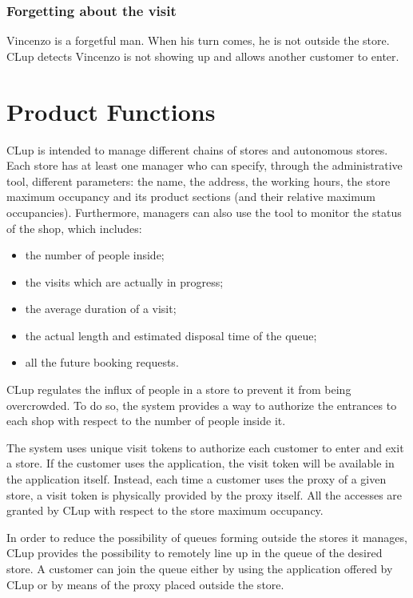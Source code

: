 \documentclass[a4paper,oneside,11pt]{book}   %
\begin{document}
        \subsubsection{Forgetting about the visit}
        Vincenzo is a forgetful man. When his turn comes, he is not outside the store. CLup detects Vincenzo is not showing up and allows another customer to enter.
    
    \section{Product Functions}
    CLup is intended to manage different chains of stores and autonomous stores. Each store has at least one manager who can specify, through the administrative tool, different parameters: the name, the address, the working hours, the store maximum occupancy and its product sections (and their relative maximum occupancies). Furthermore, managers can also use the tool to monitor the status of the shop, which includes:
    \begin{itemize}
        \item the number of people inside;
        \item the visits which are actually in progress;
        \item the average duration of a visit;
        \item the actual length and estimated disposal time of the queue;
        \item all the future booking requests.
    \end{itemize}
    CLup regulates the influx of people in a store to prevent it from being overcrowded. To do so, the system  provides a way to authorize the entrances to each shop with respect to the number of people inside it. \par
    The system uses unique visit tokens to authorize each customer to enter and exit a store. If the customer uses the application, the visit token will be available in the application itself. Instead, each time a customer uses the proxy of a given store, a visit token is physically provided by the proxy itself. All the accesses are granted by CLup with respect to the store maximum occupancy. \par
    In order to reduce the possibility of queues forming outside the stores it manages, CLup provides the possibility to remotely line up in the queue of the desired store. A customer can join the queue either by using the application offered by CLup or by means of the proxy placed outside the store. \par
\end{document}
